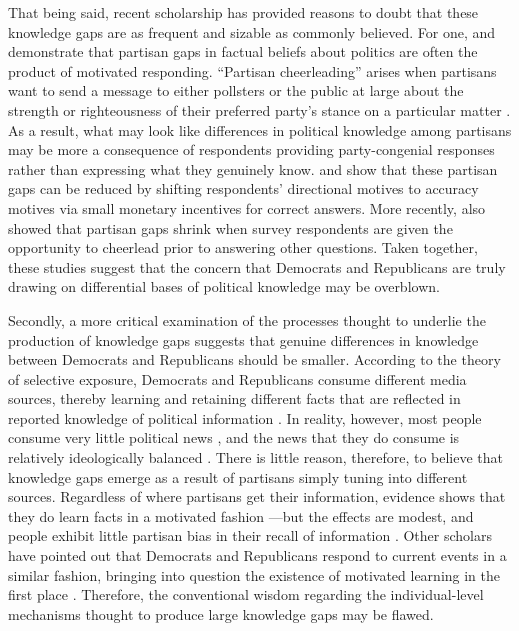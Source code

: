 \documentclass[12pt, letterpaper]{article}
\begin{document}
That being said, recent scholarship has provided reasons to doubt that these knowledge gaps are as frequent and sizable as commonly believed. For one,  \citet{bullocketal_2015} and \citet{prior2015you} demonstrate that partisan gaps in factual beliefs about politics are often the product of motivated responding. ``Partisan cheerleading'' arises when partisans want to send a message to either pollsters or the public at large about the strength or righteousness of their preferred party's stance on a particular matter \citep{huber_yair_2018}. As a result, what may look like differences in political knowledge among partisans may be more a consequence of respondents providing party-congenial responses rather than expressing what they genuinely know. \citet{bullocketal_2015} and \citet{prior2015you} show that these partisan gaps can be reduced by shifting respondents' directional motives to accuracy motives via small monetary incentives for correct answers. More recently, \citet{huber_yair_2018} also showed that partisan gaps shrink when survey respondents are given the opportunity to cheerlead prior to answering other questions. Taken together, these studies suggest that the concern that Democrats and Republicans are truly drawing on differential bases of political knowledge may be overblown.

Secondly, a more critical examination of the processes thought to underlie the production of knowledge gaps suggests that genuine differences in knowledge between Democrats and Republicans should be smaller. According to the theory of selective exposure, Democrats and Republicans consume different media sources, thereby learning and retaining different facts that are reflected in reported knowledge of political information \citep[e.g.,][]{Stroud2008,stroud_2010}. In reality, however, most people consume very little political news \citep{Prior2007,flaxmanetal_2016}, and the news that they do consume is relatively ideologically balanced \citep{flaxmanetal_2016,garzetal_2018,gentzkowshapiro_2011,guess_2020}. There is little reason, therefore, to believe that knowledge gaps emerge as a result of partisans simply tuning into different sources. Regardless of where partisans get their information, evidence shows that they do learn facts in a motivated fashion \citep{hill_2017,jerit2012partisan,khanna2018motivated}---but the effects are modest, and people exhibit little partisan bias in their recall of information \citep{khanna2018motivated}. Other scholars have pointed out that Democrats and Republicans respond to current events in a similar fashion, bringing into question the existence of motivated learning in the first place \citep{gerber_annual_review,kernell_2019}. Therefore, the conventional wisdom regarding the individual-level mechanisms thought to produce large knowledge gaps may be flawed.
\end{document}
